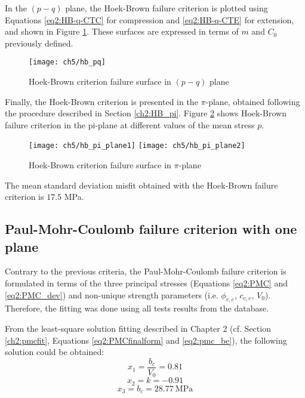 In the $(p-q)$ plane, the Hoek-Brown failure criterion is plotted using Equations \ref{eq2:HB-q-CTC} for compression and \ref{eq2:HB-q-CTE} for extension, and shown in Figure \ref{fig5:hb_pq}. These surfaces are expressed in terms of $m$ and $C_0$ previously defined. 

\begin{figure}[p]
    \centering
    \texttt{[image: ch5/hb\_pq]}
    \caption{Hoek-Brown criterion failure surface in  $(p-q)$ plane}
    \label{fig5:hb_pq}
\end{figure} 

Finally, the Hoek-Brown criterion is presented in the $\pi$-plane, obtained following the procedure described in Section \ref{ch2:HB_pi}. Figure \ref{fig5:hb_pi_plane} shows Hoek-Brown failure criterion in the pi-plane at different values of the mean stress $p$.

\begin{figure}[tb]
    \centering
    \texttt{[image: ch5/hb\_pi\_plane1]}
    \texttt{[image: ch5/hb\_pi\_plane2]}
    \caption{Hoek-Brown criterion failure surface in  $\pi$-plane}
    \label{fig5:hb_pi_plane}
\end{figure} 

The mean standard deviation misfit obtained with the Hoek-Brown failure criterion is $17.5$ \si{\mega\pascal}. 

\subsection{Paul-Mohr-Coulomb failure criterion with one plane}\label{ch5:3p_pmc}

Contrary to the previous criteria, the Paul-Mohr-Coulomb failure criterion is formulated in terms of the three principal stresses (Equations \ref{eq2:PMC} and \ref{eq2:PMC_dev}) and non-unique strength parameters (i.e. $\phi_{c,e}$, $c_{c,e}$, $V_0$). Therefore, the fitting was done using all tests results from the database. 

From the least-square solution fitting described in Chapter 2 (cf. Section \ref{ch2:pmcfit}, Equations \ref{eq2:PMCfinalform} and \ref{eq2:pmc_be}), the following solution could be obtained:
\begin{equation}
    x_1 = \frac{b_c}{V_0} = 0.81
\end{equation}
\begin{equation}
    x_2 = k = -0.91
\end{equation}
\begin{equation}\label{eq5:pmc_bc}
    x_3 = b_c = \SI{28.77}{\mega\pascal}
\end{equation}

